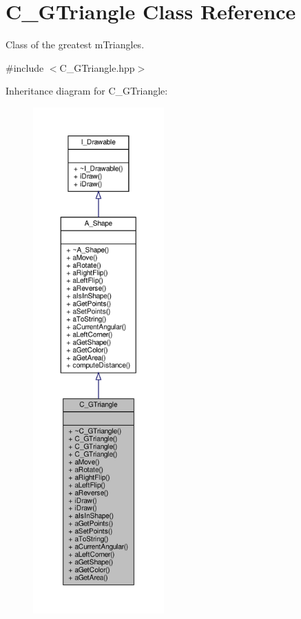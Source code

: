 \hypertarget{classC__GTriangle}{}\section{C\+\_\+\+G\+Triangle Class Reference}
\label{classC__GTriangle}


Class of the greatest m\+Triangles.  




{\ttfamily \#include $<$C\+\_\+\+G\+Triangle.\+hpp$>$}



Inheritance diagram for C\+\_\+\+G\+Triangle\+:\nopagebreak
\begin{figure}[H]
\begin{center}
\leavevmode
\includegraphics[height=550pt]{classC__GTriangle__inherit__graph}
\end{center}
\end{figure}


